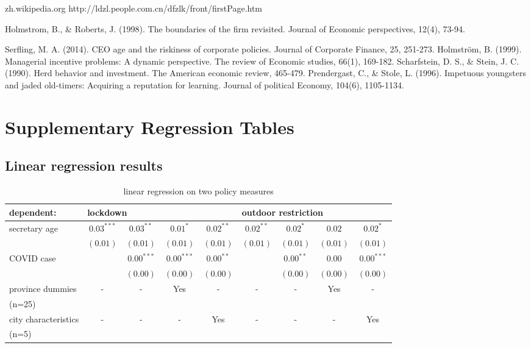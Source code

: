 \documentclass{article}
\begin{document}
\begin{CJK}{UTF8}{gbsn}
\begin{thebibliography}{999}
	zh.wikipedia.org
	http://ldzl.people.com.cn/dfzlk/front/firstPage.htm

	Holmstrom, B., \& Roberts, J. (1998). The boundaries of the firm revisited. Journal of Economic perspectives, 12(4), 73-94.

	Serfling, M. A. (2014). CEO age and the riskiness of corporate policies. Journal of Corporate Finance, 25, 251-273.
  Holmström, B. (1999). Managerial incentive problems: A dynamic perspective. The review of Economic studies, 66(1), 169-182. 
	Scharfstein, D. S., \& Stein, J. C. (1990). Herd behavior and investment. The American economic review, 465-479.
	Prendergast, C., \& Stole, L. (1996). Impetuous youngsters and jaded old-timers: Acquiring a reputation for learning. Journal of political Economy, 104(6), 1105-1134.
\end{thebibliography}


\appendix
\section{Supplementary Regression Tables}

\subsection{Linear regression results}
\begin{table}[H]
\caption{linear regression on two policy measures}
\begin{center}
\begin{tabular}{l c c c c c c c c}
\hline
dependent: & \multicolumn{4}{l}{lockdown}  & \multicolumn{4}{l}{outdoor restriction}\\
\hline
secretary age & $0.03^{***}$ & $0.03^{**}$  & $0.01^{*}$   & $0.02^{**}$ & $0.02^{**}$ & $0.02^{*}$  & $0.02$   & $0.02^{*}$   \\
              & $(0.01)$     & $(0.01)$     & $(0.01)$     & $(0.01)$    & $(0.01)$    & $(0.01)$    & $(0.01)$ & $(0.01)$     \\
COVID case    &              & $0.00^{***}$ & $0.00^{***}$ & $0.00^{**}$ &             & $0.00^{**}$ & $0.00$   & $0.00^{***}$ \\
              &              & $(0.00)$     & $(0.00)$     & $(0.00)$    &             & $(0.00)$    & $(0.00)$ & $(0.00)$     \\
province dummies &-&-&Yes&-&-&-&Yes&- \\
(n=25)\\
city characteristics &-&-&-&Yes&-&-&-&Yes \\
(n=5)\\


\end{tabular}
\end{center}
\end{table}
\end{CJK}
\end{document}
